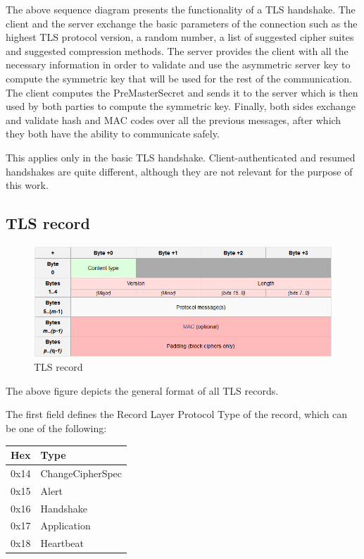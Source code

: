 The above sequence diagram presents the functionality of a TLS handshake.
The client and the server exchange the basic parameters of the connection such as 
the highest TLS protocol version, a random number, a list of suggested cipher 
suites and suggested compression methods. The server provides the client with all
the necessary information in order to validate and use the asymmetric server key
to compute the symmetric key that will be used for the rest of the communication.
The client computes the  PreMasterSecret and sends it to the server 
which is then used by both parties to compute the symmetric key.
Finally, both sides exchange and validate hash and MAC codes over all the
previous messages, after which they both have the ability to communicate safely.

This applies only in the basic TLS handshake. Client-authenticated and resumed handshakes
are quite different, although they are not relevant for the purpose of this work.


\subsection{TLS record}

\begin{figure}[H] \caption{TLS record} \centering
\includegraphics[width=1\textwidth]{diagrams/tls_record.png}\end{figure}

The above figure depicts the general format of all TLS records.

The first field defines the Record Layer Protocol Type of the record, which can
be one of the following:

\begin{table}[H] \centering \begin{tabular}{ | l | l | } \hline \textbf{Hex} &
\textbf{Type} \\ \hline 0x14 & ChangeCipherSpec \\ 0x15 & Alert \\ 0x16 &
Handshake \\ 0x17 & Application \\ 0x18 & Heartbeat \\ \hline \end{tabular}
\end{table}

